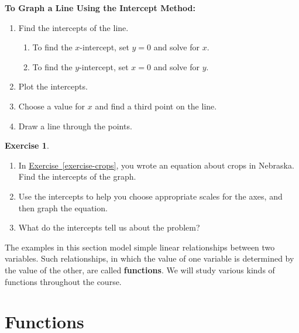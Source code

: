 \documentclass[10pt,]{book}
\newcommand{\terminology}[1]{\textbf{#1}}
\theoremstyle{plain}
\theoremstyle{definition}
\theoremstyle{definition}
\theoremstyle{definition}
\theoremstyle{definition}
\newtheorem{exercise}[theorem]{Exercise}
\numberwithin{equation}{section}
\begin{document}
\begin{mdframed}[style=assemblage]%
\noindent\textbf{\large To Graph a Line Using the Intercept Method:}\label{assemblage-3}\par\medskip

    \leavevmode%
\begin{enumerate}[label=*\arabic**]
\item\hypertarget{li-64}{}Find the intercepts of the line.%
\begin{enumerate}[label=++\alph*]
\item\hypertarget{li-65}{}To find the \(x\)-intercept, set \(y=0\) and solve for \(x\).%
\item\hypertarget{li-66}{}To find the \(y\)-intercept, set \(x = 0\) and solve for \(y\).%
\end{enumerate}
\item\hypertarget{li-67}{}Plot the intercepts.%
\item\hypertarget{li-68}{}Choose a value for \(x\) and find a third point on the line.%
\item\hypertarget{li-69}{}Draw a line through the points.%
\end{enumerate}
%
\end{mdframed}
\begin{exercise}\label{exercise-intercepts}
\leavevmode%
\begin{enumerate}[label=*\alph**]
\item\hypertarget{li-70}{}In \hyperref[exercise-crops]{Exercise~\ref{exercise-crops}}, you wrote an equation about crops in Nebraska. Find the intercepts of the graph.%
\item\hypertarget{li-71}{}Use the intercepts to help you choose appropriate scales for the axes, and then graph the equation.%
\item\hypertarget{li-72}{}What do the intercepts tell us about the problem?%
\end{enumerate}
\end{exercise}
\par
The examples in this section model simple linear relationships between two variables.
Such relationships, in which the value of one variable is determined by the value of the
other, are called \terminology{functions}. We will study various kinds of functions throughout the course.%
\typeout{************************************************}
\typeout{************************************************}
\section[Functions]{Functions}\label{functions}
\typeout{************************************************}
\typeout{************************************************}
\end{document}
